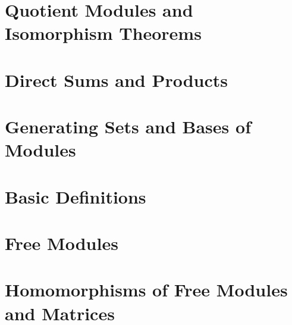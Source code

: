 		

	\section{Quotient Modules and Isomorphism Theorems}

		
		
	\section{Direct Sums and Products}
	
		
		
\section{Generating Sets and Bases of Modules} \label{sec.GenSets}

	\section{Basic Definitions}

		

	\section{Free Modules}
	
		
		
	\section{Homomorphisms of Free Modules and Matrices}
	
		



\vspace{\fill}
\printbibliography
